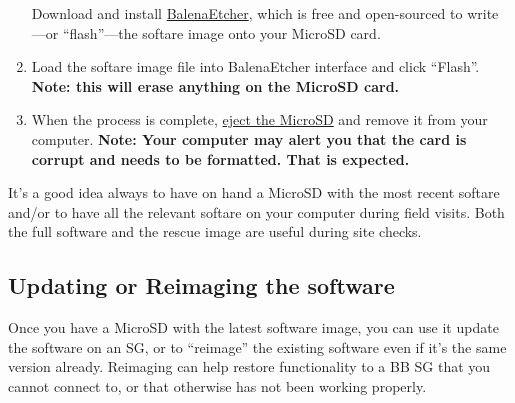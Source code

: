 \documentclass[
]{book}
\begin{document}
\begin{enumerate}
  Download and install \href{https://www.balena.io/etcher/}{BalenaEtcher}, which is free and open-sourced to write---or ``flash''---the softare image onto your MicroSD card.
\item
  Load the softare image file into BalenaEtcher interface and click ``Flash''. \textbf{Note: this will erase anything on the MicroSD card.}
\item
  When the process is complete, \href{https://support.microsoft.com/en-us/help/4051300/windows-10-safely-remove-hardware}{eject the MicroSD} and remove it from your computer. \textbf{Note: Your computer may alert you that the card is corrupt and needs to be formatted. That is expected.}
\end{enumerate}

It's a good idea always to have on hand a MicroSD with the most recent softare and/or to have all the relevant softare on your computer during field visits. Both the full software and the rescue image are useful during site checks.

\hypertarget{updating-or-reimaging-the-software}{%
\subsection{Updating or Reimaging the software}\label{updating-or-reimaging-the-software}}

Once you have a MicroSD with the latest software image, you can use it update the software on an SG, or to ``reimage'' the existing software even if it's the same version already. Reimaging can help restore functionality to a BB SG that you cannot connect to, or that otherwise has not been working properly.
\end{document}
